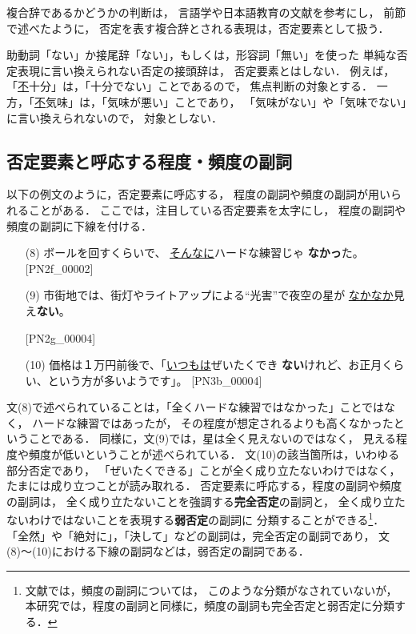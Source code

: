 \documentclass[japanese]{jnlp_1.4}
\begin{document}
複合辞であるかどうかの判断は，
言語学や日本語教育の文献\cite{morita1989,Jamasi1998}を参考にし，
前節で述べたように，
否定を表す複合辞とされる表現は，否定要素として扱う．

助動詞「ない」か接尾辞「ない」，もしくは，形容詞「無い」を使った
単純な否定表現に言い換えられない否定の接頭辞は，
否定要素とはしない．
例えば，
「\underline{不}十分」は，「十分でない」ことであるので，
焦点判断の対象とする．
一方，「\underline{不}気味」は，「気味が悪い」ことであり，
「気味がない」や「気味でない」に言い換えられないので，
対象としない．


\subsection{否定要素と呼応する程度・頻度の副詞}

以下の例文のように，否定要素に呼応する，
程度の副詞や頻度の副詞が用いられることがある．
ここでは，注目している否定要素を太字にし，
程度の副詞や頻度の副詞に下線を付ける．
\begin{enumerate}
\item[(8)] ボールを回すくらいで、
  \underline{そんなに}ハードな練習じゃ
  \textbf{なかっ}た。 [PN2f\_00002]
\item[(9)] 市街地では、街灯やライトアップによる“光害”で夜空の星が
  \underline{なかなか}見え\textbf{ない}。

  [PN2g\_00004]
\item[(10)] 価格は１万円前後で、「\underline{いつもは}ぜいたくでき
  \textbf{ない}けれど、お正月くらい、という方が多いようです」。 [PN3b\_00004]
\end{enumerate}
文(8)で述べられていることは，「全くハードな練習ではなかった」ことではなく，
ハードな練習ではあったが，
その程度が想定されるよりも高くなかったということである．
同様に，文(9)では，星は全く見えないのではなく，
見える程度や頻度が低いということが述べられている．
文(10)の該当箇所は，いわゆる部分否定であり，
「ぜいたくできる」ことが全く成り立たないわけではなく，
たまには成り立つことが読み取れる．
否定要素に呼応する，程度の副詞や頻度の副詞は，
全く成り立たないことを強調する\textbf{完全否定}の副詞と，
全く成り立たないわけではないことを表現する\textbf{弱否定}の副詞に
分類することができる\cite{neg2007}\footnote{
文献\cite{neg2007}では，頻度の副詞については，
このような分類がなされていないが，
本研究では，程度の副詞と同様に，頻度の副詞も完全否定と弱否定に分類する．}．
「全然」や「絶対に」，「決して」などの副詞は，完全否定の副詞であり，
文(8)〜(10)における下線の副詞などは，弱否定の副詞である．
\end{document}
